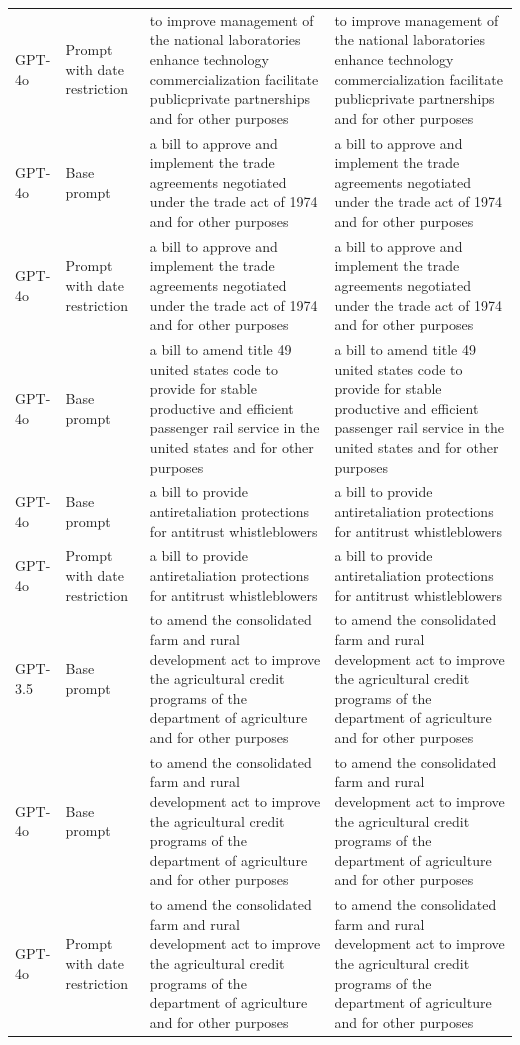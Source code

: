 \begin{longtable}{>{\raggedright\arraybackslash}p{1.4cm}>{\raggedright\arraybackslash}p{1.4cm}>{\raggedright\arraybackslash}p{5.5cm}>{\raggedright\arraybackslash}p{5.5cm}}
GPT-4o & Prompt with date restriction & to improve management of the national laboratories enhance technology commercialization facilitate publicprivate partnerships and for other purposes & to improve management of the national laboratories enhance technology commercialization facilitate publicprivate partnerships and for other purposes\\
GPT-4o & Base prompt & a bill to approve and implement the trade agreements negotiated under the trade act of 1974 and for other purposes & a bill to approve and implement the trade agreements negotiated under the trade act of 1974 and for other purposes\\
GPT-4o & Prompt with date restriction & a bill to approve and implement the trade agreements negotiated under the trade act of 1974 and for other purposes & a bill to approve and implement the trade agreements negotiated under the trade act of 1974 and for other purposes\\
GPT-4o & Base prompt & a bill to amend title 49 united states code to provide for stable productive and efficient passenger rail service in the united states and for other purposes & a bill to amend title 49 united states code to provide for stable productive and efficient passenger rail service in the united states and for other purposes\\
GPT-4o & Base prompt & a bill to provide antiretaliation protections for antitrust whistleblowers & a bill to provide antiretaliation protections for antitrust whistleblowers\\
GPT-4o & Prompt with date restriction & a bill to provide antiretaliation protections for antitrust whistleblowers & a bill to provide antiretaliation protections for antitrust whistleblowers\\
GPT-3.5 & Base prompt & to amend the consolidated farm and rural development act to improve the agricultural credit programs of the department of agriculture and for other purposes & to amend the consolidated farm and rural development act to improve the agricultural credit programs of the department of agriculture and for other purposes\\
GPT-4o & Base prompt & to amend the consolidated farm and rural development act to improve the agricultural credit programs of the department of agriculture and for other purposes & to amend the consolidated farm and rural development act to improve the agricultural credit programs of the department of agriculture and for other purposes\\
GPT-4o & Prompt with date restriction & to amend the consolidated farm and rural development act to improve the agricultural credit programs of the department of agriculture and for other purposes & to amend the consolidated farm and rural development act to improve the agricultural credit programs of the department of agriculture and for other purposes\\

\end{longtable}
